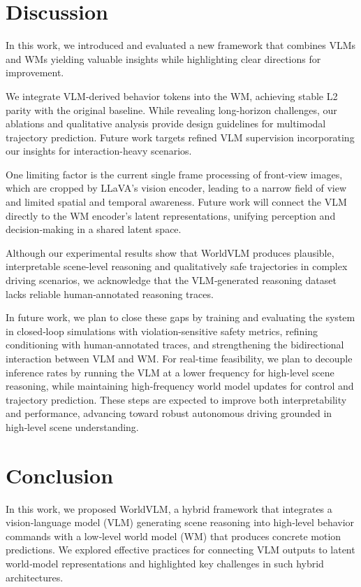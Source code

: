 \documentclass[letterpaper, 10 pt, conference]{ieeeconf}
\begin{document}
\section{Discussion}
In this work, we introduced and evaluated a new framework that combines VLMs and WMs yielding valuable insights while highlighting clear directions for improvement. 

We integrate VLM-derived behavior tokens into the WM, achieving stable L2 parity with the original baseline. While revealing long-horizon challenges, our ablations and qualitative analysis provide design guidelines for multimodal trajectory prediction. Future work targets refined VLM supervision incorporating our insights for interaction-heavy scenarios.

One limiting factor is the current single frame processing of front‑view images, which are cropped by LLaVA’s vision encoder, leading to a narrow field of view and limited spatial and temporal awareness. Future work will connect the VLM directly to the WM encoder’s latent representations, unifying perception and decision‑making in a shared latent space.

Although our experimental results show that WorldVLM produces plausible, interpretable scene‑level reasoning and qualitatively safe trajectories in complex driving scenarios, we acknowledge that the VLM‑generated reasoning dataset lacks reliable human‑annotated reasoning traces. 

In future work, we plan to close these gaps by training and evaluating the system in closed‑loop simulations with violation-sensitive safety metrics, refining conditioning with human‑annotated traces, and strengthening the bidirectional interaction between VLM and WM. For real-time feasibility, we plan to decouple inference rates by running the VLM at a lower frequency for high-level scene reasoning, while maintaining high-frequency world model updates for control and trajectory prediction. These steps are expected to improve both interpretability and performance, advancing toward robust autonomous driving grounded in high‑level scene understanding. 

\section{Conclusion}
In this work, we proposed WorldVLM, a hybrid framework that integrates a vision‑language model (VLM) generating scene reasoning into high‑level behavior commands with a low‑level world model (WM) that produces concrete motion predictions. We explored effective practices for connecting VLM outputs to latent world‑model representations and highlighted key challenges in such hybrid architectures.
\end{document}
